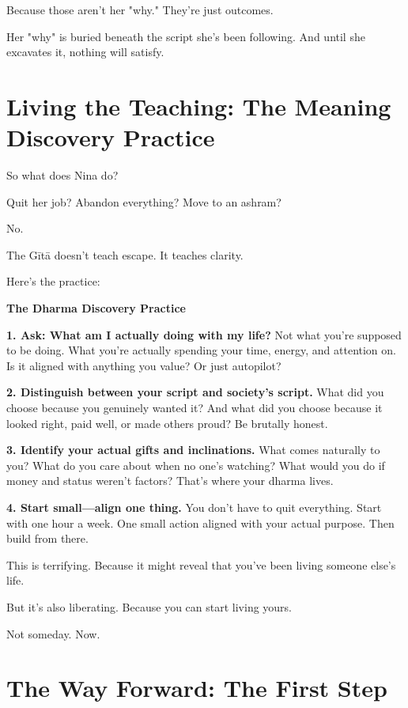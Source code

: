 \documentclass[11pt,twoside]{book}
\begin{document}
Because those aren't her "why." They're just outcomes.

Her "why" is buried beneath the script she's been following. And until she excavates it, nothing will satisfy.

\section*{Living the Teaching: The Meaning Discovery Practice}

So what does Nina do?

Quit her job? Abandon everything? Move to an ashram?

No.

The Gītā doesn't teach escape. It teaches clarity.

Here's the practice:

\begin{practicebox}
\textbf{The Dharma Discovery Practice}

\textbf{1. Ask: What am I actually doing with my life?}
Not what you're supposed to be doing. What you're actually spending your time, energy, and attention on. Is it aligned with anything you value? Or just autopilot?

\textbf{2. Distinguish between your script and society's script.}
What did you choose because you genuinely wanted it? And what did you choose because it looked right, paid well, or made others proud? Be brutally honest.

\textbf{3. Identify your actual gifts and inclinations.}
What comes naturally to you? What do you care about when no one's watching? What would you do if money and status weren't factors? That's where your dharma lives.

\textbf{4. Start small—align one thing.}
You don't have to quit everything. Start with one hour a week. One small action aligned with your actual purpose. Then build from there.
\end{practicebox}

This is terrifying. Because it might reveal that you've been living someone else's life.

But it's also liberating. Because you can start living yours.

Not someday. Now.

\section*{The Way Forward: The First Step}
\end{document}
